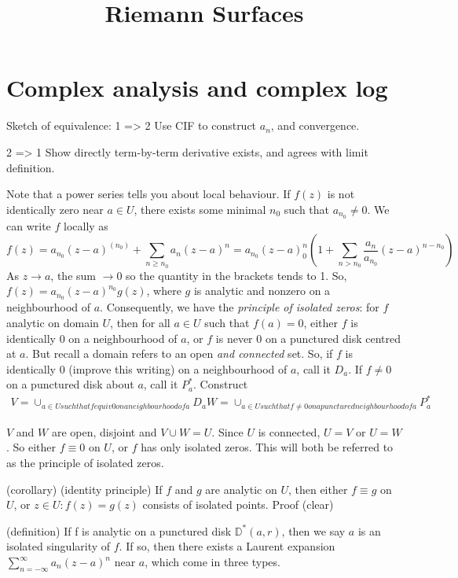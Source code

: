 \documentclass{article}
\title{Riemann Surfaces}
\begin{document}
\maketitle

\section{Complex analysis and complex log}

Sketch of equivalence:
1 => 2 Use CIF to construct $a_n$, and convergence.

2 => 1 Show directly term-by-term derivative exists, and agrees with limit definition.

Note that a power series tells you about local behaviour. If $f(z)$ is not identically zero near $a \in U$, there exists some minimal $n_0$ such that $a_{n_0} \neq 0$.  We can write $f$ locally as
\begin{equation}
    f(z) = a_{n_0} (z-a)^(n_0) + \sum_{n \ge n_0} a_n (z-a)^n = a_{n_0} (z-a)^n_0 \left(1 + \sum_{n>n_0} \frac{a_n}{a_{n_0}} (z-a)^{n-n_0}\right)
\end{equation}
As $z \to a$, the sum $\to 0$ so the quantity in the brackets tends to 1.  So, $f(z) = a_{n_0} (z-a)^{n_0} g(z)$, where $g$ is analytic and nonzero on a neighbourhood of $a$.
Consequently, we have the \emph{principle of isolated zeros}: for $f$ analytic on domain $U$, then for all $a \in U$ such that $f(a) = 0$, either $f$ is identically $0$ on a neighbourhood of $a$, or $f$ is never $0$ on a punctured disk centred at $a$.  But recall a domain refers to an open \emph{and connected} set.  So, if $f$ is identically $0$ (improve this writing) on a neighbourhood of $a$, call it $D_a$.  If $f \ne 0$ on a punctured disk about $a$, call it $P_a^*$. Construct
\begin{align}
V = \cup_{a \in U such that f equiv 0 on a neighbourhood of a} D_a
W = \cup_{a \in U such that f \ne 0 on a punctured neighbourhood of a} P_a^*
\end{align}

$V$ and $W$ are open, disjoint and $V \cup W = U$. Since $U$ is connected, $U=V$ or $U=W$. So either $f \equiv 0$ on $U$, or $f$ has only isolated zeros.
This will both be referred to as the principle of isolated zeros.

(corollary) (identity principle)
If $f$ and $g$ are analytic on $U$, then either $f \equiv g$ on $U$, or ${z \in U : f(z) = g(z)}$ consists of isolated points.
Proof (clear)

(definition)
If f is analytic on a punctured disk $\mathbb{D}^*(a,r)$, then we say $a$ is an isolated singularity of $f$.
If so, then there exists a Laurent expansion $\sum_{n=-\infty}^{\infty} a_n (z-a)^n$ near $a$, which come in three types.
\end{document}

